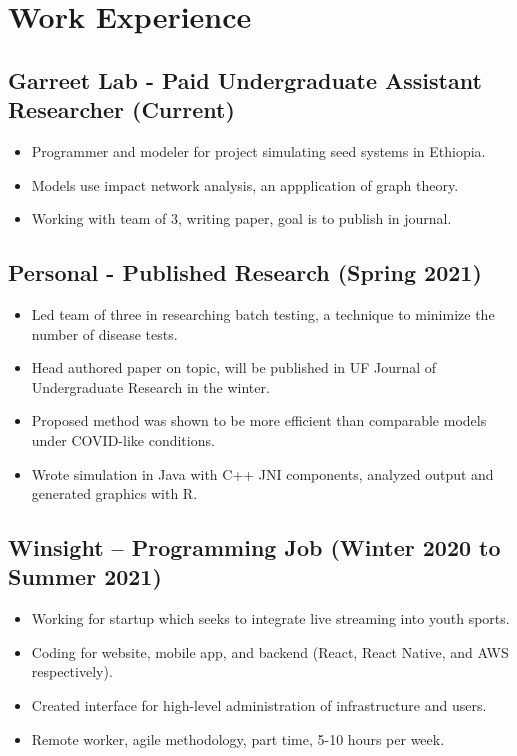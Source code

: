 \documentclass{article}
\newenvironment{CustomItemize}
{ \begin{itemize}[leftmargin=0em]
    \setlength{\itemsep}{0pt}
    \setlength{\parskip}{0pt}
    \setlength{\parindent}{0pt}
    \setlength{\parsep}{0pt}     }
{ \end{itemize}                  }
\begin{document}

\section{Work Experience}

\subsection{Garreet Lab - Paid Undergraduate Assistant Researcher (Current)}
\begin{CustomItemize}
\item Programmer and modeler for project simulating seed systems in Ethiopia.
\item Models use impact network analysis, an appplication of graph theory.
\item Working with team of 3, writing paper, goal is to publish in journal.
\end{CustomItemize}

\subsection{Personal - Published Research (Spring 2021)}
\begin{CustomItemize}
\item Led team of three in researching batch testing, a technique to minimize the number of disease tests.
\item Head authored paper on topic, will be published in UF Journal of Undergraduate Research in the winter.
\item Proposed method was shown to be more efficient than comparable models under COVID-like conditions.
\item Wrote simulation in Java with C++ JNI components, analyzed output and generated graphics with R.
\end{CustomItemize}

\subsection{Winsight – Programming Job (Winter 2020 to Summer 2021)}
\begin{CustomItemize}
\item Working for startup which seeks to integrate live streaming into youth sports.
\item Coding for website, mobile app, and backend (React, React Native, and AWS respectively).
\item Created interface for high-level administration of infrastructure and users.
\item Remote worker, agile methodology, part time, 5-10 hours per week.
\end{CustomItemize}
\end{document}
